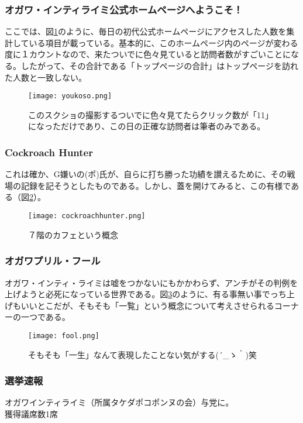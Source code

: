 \subsubsection{オガワ・インティライミ公式ホームページへようこそ！}
ここでは、図\ref{youkoso}のように、毎日の初代公式ホームページにアクセスした人数を集計している項目が載っている。基本的に、このホームページ内のページが変わる度に１カウントなので、来たついでに色々見ていると訪問者数がすごいことになる。したがって、その合計である「トップページの合計」はトップページを訪れた人数と一致しない。

\begin{figure}[H]
  \centering
  \texttt{[image: youkoso.png]}
  \caption{このスクショの撮影するついでに色々見てたらクリック数が「11」になっただけであり、この日の正確な訪問者は筆者のみである。}
\label{youkoso}
\end{figure}

\subsubsection{Cockroach Hunter}
これは確か、G嫌いの(ポ)氏が、自らに打ち勝った功績を讃えるために、その戦場の記録を記そうとしたものである。しかし、蓋を開けてみると、この有様である（図\ref{cockroachhunter}）。

\begin{figure}[H]
  \centering
  \texttt{[image: cockroachhunter.png]}
  \caption{７階のカフェという概念}
\label{cockroachhunter}
\end{figure}

\subsubsection{オガワプリル・フール}
オガワ・インティ・ライミは嘘をつかないにもかかわらず、アンチがその判例を上げようと必死になっている世界である。図\ref{fool}のように、有る事無い事でっち上げもいいとこだが、そもそも「一覧」という概念について考えさせられるコーナーの一つである。

\begin{figure}[H]
  \centering
  \texttt{[image: fool.png]}
  \caption{そもそも「一生」なんて表現したことない気がする\sf (´\_ゝ｀)笑}
\label{fool}
\end{figure}


\subsubsection{選挙速報}
オガワインティライミ（所属タケダポコポンヌの会）与党に。 \\
獲得議席数1席\\

